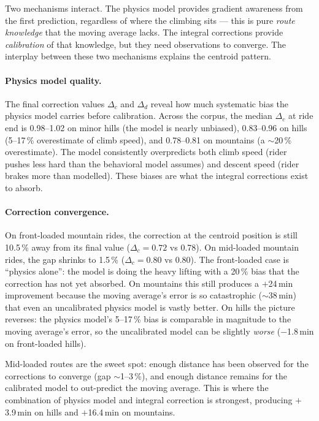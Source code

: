 \documentclass[11pt,a4paper]{article}
\begin{document}
Two mechanisms interact. The physics model provides gradient
awareness from the first prediction, regardless of where the climbing
sits --- this is pure \emph{route knowledge} that the moving average
lacks. The integral corrections provide \emph{calibration} of that
knowledge, but they need observations to converge. The interplay
between these two mechanisms explains the centroid pattern.

\paragraph{Physics model quality.}
The final correction values $\Delta_c$ and $\Delta_d$ reveal how much
systematic bias the physics model carries before calibration. Across
the corpus, the median $\Delta_c$ at ride end is 0.98--1.02 on minor
hills (the model is nearly unbiased), 0.83--0.96 on hills (5--17\,\%
overestimate of climb speed), and 0.78--0.81 on mountains (a
$\sim$20\,\% overestimate). The model consistently overpredicts both
climb speed (rider pushes less hard than the behavioral model
assumes) and descent speed (rider brakes more than modelled). These
biases are what the integral corrections exist to absorb.

\paragraph{Correction convergence.}
On front-loaded mountain rides, the correction at the centroid
position is still 10.5\,\% away from its final value
($\Delta_c = 0.72$ vs 0.78). On mid-loaded mountain rides, the gap
shrinks to 1.5\,\% ($\Delta_c = 0.80$ vs 0.80). The front-loaded
case is ``physics alone'': the model is doing the heavy lifting with
a 20\,\% bias that the correction has not yet absorbed. On mountains
this still produces a $+$24\,\si{\minute} improvement because the
moving average's error is so catastrophic ($\sim$38\,\si{\minute})
that even an uncalibrated physics model is vastly better. On hills
the picture reverses: the physics model's 5--17\,\% bias is
comparable in magnitude to the moving average's error, so the
uncalibrated model can be slightly \emph{worse} ($-$1.8\,\si{\minute}
on front-loaded hills).

Mid-loaded routes are the sweet spot: enough distance has been
observed for the corrections to converge (gap $\sim$1--3\,\%), and
enough distance remains for the calibrated model to out-predict the
moving average. This is where the combination of physics model and
integral correction is strongest, producing $+$3.9\,\si{\minute}
on hills and $+$16.4\,\si{\minute} on mountains.
\end{document}
